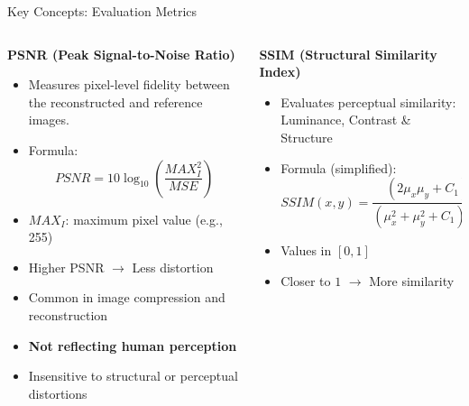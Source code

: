 \documentclass[aspectratio=169,xcolor=dvipsnames]{beamer}
\begin{document}
\begin{frame}{Key Concepts: Evaluation Metrics}

\begin{columns}[c]

\begin{column}{0.50\textwidth}

\textbf{PSNR (Peak Signal-to-Noise Ratio)}

\begin{itemize}
    \item Measures pixel-level fidelity between the reconstructed and reference images.
    
    \item Formula:
    \vspace{-0.2cm}
    {\scriptsize
    \[
    PSNR = 10 \log_{10} \left( \frac{MAX_I^2}{MSE} \right)
    \]
    }
    \vspace{-0.6cm}
    \item $MAX_I$: maximum pixel value (e.g., 255)  
    \item Higher PSNR $\rightarrow$ Less distortion  
    \item Common in image compression and reconstruction
    \item \textbf{Not reflecting human perception}
    \item Insensitive to structural or perceptual distortions
\end{itemize}

\end{column}

\begin{column}{0.50\textwidth}

\textbf{SSIM (Structural Similarity Index)}

\begin{itemize}
    \item Evaluates perceptual similarity: Luminance, Contrast \& Structure
    
    \item Formula (simplified):
    \vspace{-0.2cm}
    {\scriptsize
    \[
    SSIM(x, y) = \frac{(2\mu_x\mu_y + C_1)(2\sigma_{xy} + C_2)}{(\mu_x^2 + \mu_y^2 + C_1)(\sigma_x^2 + \sigma_y^2 + C_2)}
    \]
    }
    \vspace{-0.6cm}
    \item Values in $[0, 1]$  
    \item Closer to $1$ $\rightarrow$ More similarity
\end{itemize}


\end{column}
\end{columns}
\end{frame}
\end{document}
